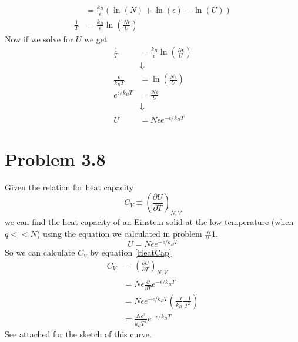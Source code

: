 \documentclass[11pt]{article}
\numberwithin{equation}{section}
\begin{document}
\begin{align*}
&= \frac{k_B}{\epsilon}\left(\ln(N) + \ln(\epsilon) - \ln(U)\right)\\
\frac{1}{T}  &= \frac{k_B}{\epsilon}\ln\left(\frac{N\epsilon}{U}\right)
\end{align*}
Now if we solve for $U$ we get
\begin{align*}
\frac{1}{T}  &= \frac{k_B}{\epsilon}\ln\left(\frac{N\epsilon}{U}\right)\\
&\Downarrow\\
\frac{\epsilon}{k_BT} &= \ln\left(\frac{N\epsilon}{U}\right)\\
e^{\epsilon/k_BT} &= \frac{N\epsilon}{U}\\
&\Downarrow\\
U &= N\epsilon e^{-\epsilon/k_BT} 
\end{align*}

\section{Problem 3.8}
Given the relation for heat capacity 
\begin{equation}
C_V \equiv \left(\frac{\partial U}{\partial T}\right)_{N,V}
\label{HeatCap}
\end{equation}
we can find the heat capacity of an Einstein solid at the low temperature (when $q<<N$) using the equation we calculated in problem \#1. 
$$U = N\epsilon e^{-\epsilon/k_BT}$$
So we can calculate $C_V$ by equation \ref{HeatCap}
\begin{align*}
C_V &= \left(\frac{\partial U}{\partial T}\right)_{N,V}\\
&= N\epsilon \frac{\partial}{\partial T}e^{-\epsilon/k_BT}\\
&= N\epsilon e^{-\epsilon/k_BT}\left(\frac{-\epsilon}{k_B}\frac{-1}{T^2}\right)\\
&= \frac{N\epsilon^2}{k_BT^2} e^{-\epsilon/k_BT}
\end{align*}
See attached for the sketch of this curve.
\end{document}
